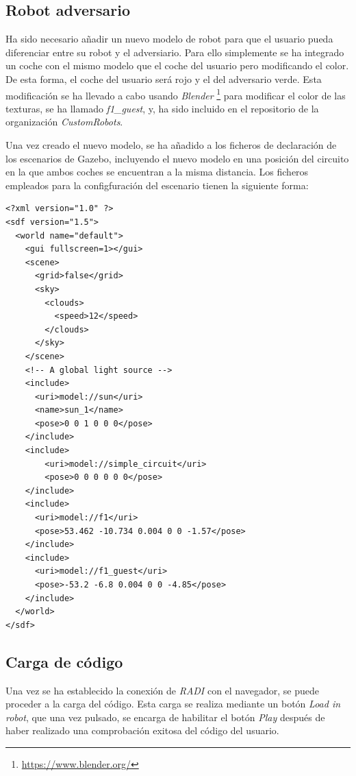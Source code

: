\documentclass[a4paper, 12pt]{book}
\begin{document}
\subsection{Robot adversario}
\label{follow_line_game_adversario}

Ha sido necesario añadir un nuevo modelo de robot para que el usuario pueda diferenciar entre su robot y el adversiario. Para ello simplemente se ha integrado un coche con el mismo modelo que el coche del usuario pero modificando el color. De esta forma, el coche del usuario será rojo y el del adversario verde. Esta modificación se ha llevado a cabo usando \emph{Blender} \footnote{\url{https://www.blender.org/}} para modificar el color de las texturas, se ha llamado \emph{f1\_guest}, y, ha sido  incluido en el repositorio de la organización \emph{CustomRobots}.

Una vez creado el nuevo modelo, se ha añadido a los ficheros de declaración de los escenarios de Gazebo, incluyendo el nuevo modelo en una posición del circuito en la que ambos coches se encuentran a la misma distancia. Los ficheros empleados para la configfuración del escenario tienen la siguiente forma:

\begin{lstlisting}
<?xml version="1.0" ?>
<sdf version="1.5">
  <world name="default">
    <gui fullscreen=1></gui>
    <scene>
      <grid>false</grid>
      <sky>
        <clouds>
          <speed>12</speed>
        </clouds>
      </sky>
    </scene>
    <!-- A global light source -->
    <include>
      <uri>model://sun</uri>
      <name>sun_1</name>
      <pose>0 0 1 0 0 0</pose>
    </include>
    <include>
	    <uri>model://simple_circuit</uri>
	    <pose>0 0 0 0 0 0</pose>
    </include>
    <include>
      <uri>model://f1</uri>
      <pose>53.462 -10.734 0.004 0 0 -1.57</pose>
    </include>
    <include>
      <uri>model://f1_guest</uri>
      <pose>-53.2 -6.8 0.004 0 0 -4.85</pose>
    </include>
  </world>
</sdf>
\end{lstlisting}

\subsection{Carga de código}
\label{follow_line_game_code_load}

Una vez se ha establecido la conexión de \emph{RADI} con el navegador, se puede proceder a la carga del código. Esta carga se realiza mediante un botón \emph{Load in robot}, que una vez pulsado, se encarga de habilitar el botón \emph{Play} después de haber realizado una comprobación exitosa del código del usuario.
\end{document}
